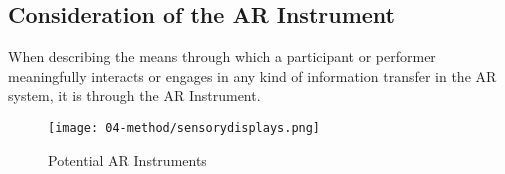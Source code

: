 \subsection{Consideration of the AR Instrument} \label{sec: discussion-patterns-instrument}
When describing the means through which a participant or performer meaningfully interacts or engages in any kind of information transfer in the AR system, it is through the AR Instrument. 
\begin{figure}
    \centering
    {\texttt{[image: 04-method/sensorydisplays.png]}}
    \caption[Potential AR Instruments]{Potential AR Instruments}
\end{figure}\label{fig: ARinstrument}
